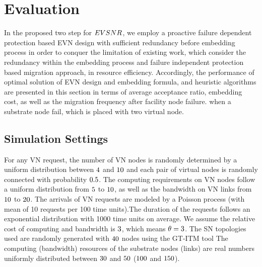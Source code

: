 
\section{Evaluation}
In the proposed two step for $EVSNR$, we employ a proactive failure dependent protection based EVN design with sufficient redundancy before embedding process in order to conquer the limitation of existing work, which consider the redundancy within
the embedding process and failure independent protection based migration approach, in resource efficiency. Accordingly, the performance of optimal solution of EVN design and embedding formula, and heuristic algorithms are presented in this section in terms of average acceptance ratio, embedding cost, as well as the migration frequency after facility node failure. when a substrate node fail, which is placed with two virtual node.


\subsection{Simulation Settings}
For any VN request, the number of VN nodes is randomly determined by a uniform distribution between $4$ and $10$ and each pair of virtual nodes is randomly connected with probability $0.5$. The computing requirements on VN nodes follow a uniform distribution from $5$ to $10$, as well as the bandwidth on VN links from $10$ to $20$. The arrivals of VN requests are modeled by a Poisson process (with mean of 10 requests per 100 time units).The duration of the requests follows an exponential distribution with 1000 time units on average.
We assume the relative cost of computing and bandwidth is $3$\cite{armbrust2009above,yu2010survivable}, which means $\theta=3$. The SN topologies used are randomly generated with $40$ nodes using the GT-ITM tool\cite{zegura1996model} The computing
(bandwidth) resources of the substrate nodes (links) are real
numbers uniformly distributed between $30$ and $50$ ($100$ and
$150$).

